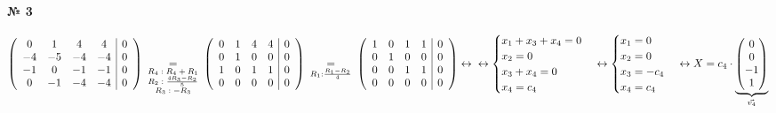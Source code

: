 \documentclass[a4paper, 12pt]{article}
\newenvironment{task}[1][0]{\vspace{.5cm} {\textbf{№ #1} \vspace{.5cm}\\ }}{}
\begin{document}
\begin{task}[3]
\begin{description}
{\begin{enumerate}
{$\left(
\begin{array}{cccc|c}
	0 & 1 & 4 & 4 & 0\\
	-4 & -5 & -4 & -4 & 0\\
	-1 & 0 & -1 & -1 & 0\\
	0 & -1 & -4 & -4 & 0\\
\end{array}
\right) \: \underset{
\begin{subarray}{c}
	\text{$R_4: R_4+R_1$}\\
	\text{$R_2: \frac{4R_3-R_2}{5}$}\\
	\text{$R_3: -R_3$}\\
\end{subarray}}{=} \:
\left(
\begin{array}{cccc|c}
	0 & 1 & 4 & 4 & 0\\
	0 & 1 & 0 & 0 & 0\\
	1 & 0 & 1 & 1 & 0\\
	0 & 0 & 0 & 0 & 0\\
\end{array}\right) \: \underset{R_1: \frac{R_1-R_2}{4}}{=} \:
\left(
\begin{array}{cccc|c}
	1 & 0 & 1 & 1 & 0\\
	0 & 1 & 0 & 0 & 0\\
	0 & 0 & 1 & 1 & 0\\
	0 & 0 & 0 & 0 & 0\\
\end{array}
\right) \leftrightarrow\\\leftrightarrow
\begin{cases}
	x_1+x_3+x_4 = 0\\
	x_2=0\\
	x_3+x_4=0\\
	x_4=c_4\\
\end{cases} \leftrightarrow
\begin{cases}
	x_1 = 0\\
	x_2 = 0\\
	x_3=-c_4\\
	x_4=c_4\\
\end{cases} \leftrightarrow X = c_4 \cdot \underbrace{
\begin{pmatrix}
	0\\0\\-1\\1\\
\end{pmatrix}}_{\vec{v_4}}\\
$
}
\end{enumerate}
}
\end{description}


\end{task}
\end{document}
